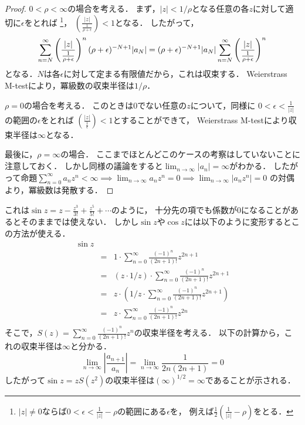 \documentclass[a4paper]{jsarticle}
\begin{document}
\begin{proof}
            $0 < \rho<\infty$の場合を考える．
            まず，$|z|<1/\rho$となる任意の各$z$に対して適切に$\epsilon$をとれば
            \footnote{ $|z| \neq 0$ならば$0< \epsilon < \frac{1}{|z|} - \rho$の範囲にある$\epsilon$を，
            例えば$\frac{1}{2} \left(\frac{1}{|z|} - \rho \right)$をとる． }，
            $\left( \frac{|z|}{\frac{1}{\rho+\epsilon}} \right)<1$となる．
            したがって，
            \begin{equation*}
                \sum_{n=N}^{\infty}{ \left( \frac{|z|}{\frac{1}{\rho+\epsilon}} \right)^{n} (\rho+\epsilon)^{-N+1} |a_N|} \\
                =(\rho+\epsilon)^{-N+1} |a_N| \sum_{n=N}^{\infty}{ \left( \frac{|z|}{\frac{1}{\rho+\epsilon}} \right)^{n}}
            \end{equation*}
            となる．$N$は各$\epsilon$に対して定まる有限値だから，これは収束する．
            Weierstrass M-testにより，冪級数の収束半径は$1/\rho$．

            $\rho=0$の場合を考える．
            このときは0でない任意の$z$について，同様に
            $ 0< \epsilon < \frac{1}{|z|}$の範囲の$\epsilon$をとれば
            $\left( \frac{|z|}{\frac{1}{\epsilon}} \right)<1$とすることができて，
            Weierstrass M-testにより収束半径は$\infty$となる．

            最後に，$\rho=\infty$の場合．
            ここまでほとんどこのケースの考察はしていないことに注意しておく．
            しかし同様の議論をすると$\lim_{n \to \infty}{|a_n|}=\infty$がわかる．
            したがって命題$\sum_{n=0}^{\infty}{a_n z^n} < \infty \implies \lim_{n \to \infty}{a_n z^n}=0 \implies \lim_{n \to \infty}{|a_n z^n|}=0$
            の対偶より，冪級数は発散する．
        \end{proof}

        これは$\sin z=z-\frac{z^3}{3!}+\frac{z^5}{5!}+\cdots$のように，
        十分先の項でも係数が0になることがあるとそのままでは使えない．
        しかし$\sin z$や$\cos z$には以下のように変形するとこの方法が使える．
        \begin{eqnarray*}
            \sin z \\
            &=& 1 \cdot \sum_{n=0}^{\infty}{\frac{(-1)^{n}}{(2n+1)!}z^{2n+1}} \\
            &=& (z \cdot 1/z) \cdot \sum_{n=0}^{\infty}{\frac{(-1)^{n}}{(2n+1)!}z^{2n+1}} \\
            &=& z \cdot \left(1/z \cdot \sum_{n=0}^{\infty}{\frac{(-1)^{n}}{(2n+1)!}z^{2n+1}} \right) \\
            &=& z \cdot \sum_{n=0}^{\infty}{\frac{(-1)^{n}}{(2n+1)!}z^{2n}} \\
        \end{eqnarray*}
        そこで，$S(z)=\sum_{n=0}^{\infty}{\frac{(-1)^{n}}{(2n+1)!}z^n}$の収束半径を考える．
        以下の計算から，これの収束半径は$\infty$と分かる．
        \[
            \lim_{n \to \infty} \left| \frac{a_{n+1}}{a_n} \right|
            = \lim_{n \to \infty} \frac{1}{2n(2n+1)}=0
        \]
        したがって$\sin z=zS(z^2)$の収束半径は$(\infty)^{1/2}=\infty$であることが示される．
\end{document}
